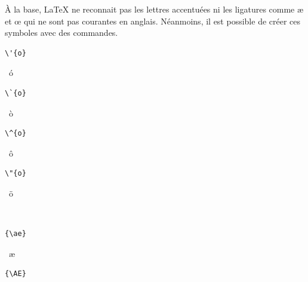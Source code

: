 À la base, {\LaTeX} ne reconnait pas les lettres accentuées ni les
ligatures comme {\ae} et {\oe} qui ne sont pas courantes en anglais.
Néanmoins, il est possible de créer ces symboles avec des commandes.
\begin{demo}
  \begin{minipage}{0.2\linewidth}
    \begin{texample}
\begin{lstlisting}
\'{o}
\end{lstlisting}
      \producing\ \'{o}
    \end{texample}
  \end{minipage}
  \hfill
  \begin{minipage}{0.2\linewidth}
    \begin{texample}
\begin{lstlisting}[escapeinside={}]
\`{o}
\end{lstlisting}
      \producing\ \`{o}
    \end{texample}
  \end{minipage}
  \hfill
  \begin{minipage}{0.2\linewidth}
    \begin{texample}
\begin{lstlisting}
\^{o}
\end{lstlisting}
      \producing\ \^{o}
    \end{texample}
  \end{minipage}
  \hfill
  \begin{minipage}{0.2\linewidth}
    \begin{texample}
\begin{lstlisting}
\"{o}
\end{lstlisting}
      \producing\ \"{o}
    \end{texample}
  \end{minipage} \\
  \hfill
  \begin{minipage}{0.2\linewidth}
    \begin{texample}
\begin{lstlisting}
{\ae}
\end{lstlisting}
      \producing\ \ae
    \end{texample}
  \end{minipage}
  \hfill
  \begin{minipage}{0.2\linewidth}
    \begin{texample}
\begin{lstlisting}
{\AE}
\end{lstlisting}

\end{texample}
\end{minipage}
\end{demo}
